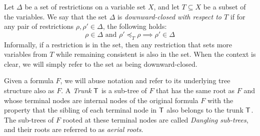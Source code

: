 \begin{definition}
\label{def:downward-closed}
Let $\Delta$ be a set of restrictions on a variable set $X$, and let $T \subseteq X$ be a subset of the variables. We say that the set $\Delta$ is \emph{downward-closed with respect to $T$} if for any pair of restrictions $\rho, \rho' \in \Delta$, the following holds:
$$
\rho \in \Delta \text{ and } \rho' \preceq_T \rho \implies \rho' \in \Delta
$$
Informally, if a restriction is in the set, then any restriction that sets more variables from $T$ while remaining consistent is also in the set. When the context is clear, we will simply refer to the set as being downward-closed.
\end{definition}


\begin{definition}
\label{def:trunk-and-dangling}
Given a formula $F$, we will abuse notation and refer to its underlying tree structure also as $F$. A \emph{Trunk} $\mathsf{T}$ is a sub-tree of $F$ that has the same root as $F$ and whose terminal nodes are internal nodes of the original formula $F$ with the property that the sibling of each terminal node in $\mathsf{T}$ also belongs to the trunk $\mathsf{T}$. 
The sub-trees of $F$ rooted at these terminal nodes are called \emph{Dangling sub-trees}, and their roots are referred to as \emph{aerial roots}.
\end{definition}

